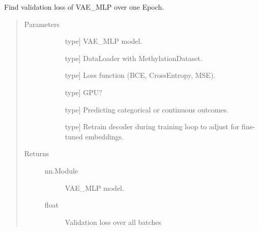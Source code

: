 \documentclass[letterpaper,10pt,english]{sphinxmanual}
\begin{document}
\begin{fulllineitems}
\label{\detokenize{index:methylnet.models.val_mlp}}
Find validation loss of VAE\_MLP over one Epoch.
\begin{quote}\begin{description}
\item[{Parameters}] \leavevmode\begin{description}
\item[{}] \leavevmode{[}type{]}
VAE\_MLP model.

\item[{}] \leavevmode{[}type{]}
DataLoader with MethylationDataset.

\item[{}] \leavevmode{[}type{]}
Loss function (BCE, CrossEntropy, MSE).

\item[{}] \leavevmode{[}type{]}
GPU?

\item[{}] \leavevmode{[}type{]}
Predicting categorical or continuous outcomes.

\item[{}] \leavevmode{[}type{]}
Retrain decoder during training loop to adjust for fine-tuned embeddings.

\end{description}

\item[{Returns}] \leavevmode\begin{description}
\item[{nn.Module}] \leavevmode
VAE\_MLP model.

\item[{float}] \leavevmode
Validation loss over all batches

\end{description}

\end{description}\end{quote}

\end{fulllineitems}

\end{document}
